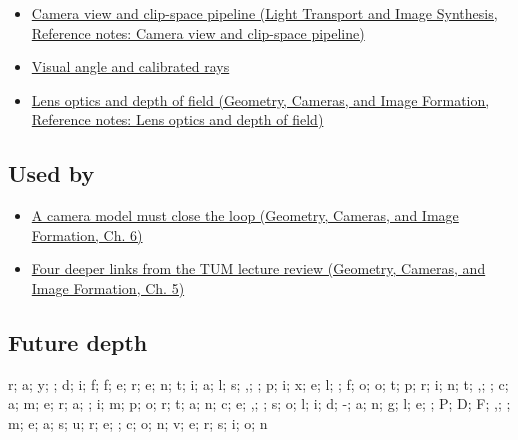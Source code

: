 \begin{itemize}
\tightlist
\item
  \href{../04-Light-Transport-and-Image-Synthesis/main.pdf\#nameddest=appendix-1c07d64f5e70}{Camera view and clip-space pipeline (Light Transport and Image Synthesis, Reference notes: Camera view and clip-space pipeline)}
\item
  \hyperref[appendix-7d356c396d1a]{Visual angle and calibrated rays}
\item
  \href{../03-Geometry-Cameras-and-Image-Formation/main.pdf\#nameddest=appendix-21f8456e2629}{Lens optics and depth of field (Geometry, Cameras, and Image Formation, Reference notes: Lens optics and depth of field)}
\end{itemize}

\subsection{Used by}\label{appendix-8c40fad29462-used-by}

\begin{itemize}
\tightlist
\item
  \href{../03-Geometry-Cameras-and-Image-Formation/main.pdf\#nameddest=02-foundations-ii-ch037-a-camera-model-must-close-the-loop}{A camera model must close the loop (Geometry, Cameras, and Image Formation, Ch. 6)}
\item
  \href{../03-Geometry-Cameras-and-Image-Formation/main.pdf\#nameddest=02-foundations-ii-ch036-four-deeper-links-from-the-tum-lecture-review}{Four deeper links from the TUM lecture review (Geometry, Cameras, and Image Formation, Ch. 5)}
\end{itemize}

\subsection{Future depth}\label{appendix-8c40fad29462-future-depth}

r; a; y; ; d; i; f; f; e; r; e; n; t; i; a; l; s; ,; ; p; i; x; e; l; ; f; o; o; t; p; r; i; n; t; ,; ; c; a; m; e; r; a; ; i; m; p; o; r; t; a; n; c; e; ,; ; s; o; l; i; d; -; a; n; g; l; e; ; P; D; F; ,; ; m; e; a; s; u; r; e; ; c; o; n; v; e; r; s; i; o; n
